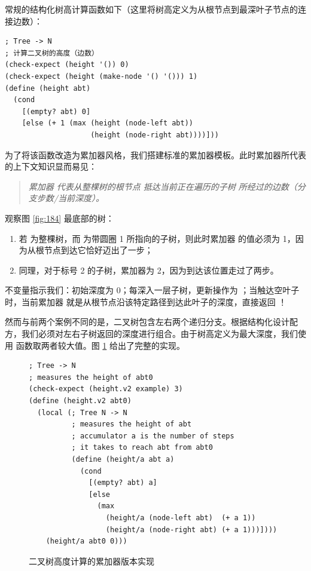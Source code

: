 常规的结构化树高计算函数如下（这里将树高定义为从根节点到最深叶子节点的连接边数）：

\begin{lstlisting}[language=BSL]
; Tree -> N
; 计算二叉树的高度（边数）
(check-expect (height '()) 0)
(check-expect (height (make-node '() '())) 1)
(define (height abt)
  (cond
    [(empty? abt) 0]
    [else (+ 1 (max (height (node-left abt))
                    (height (node-right abt))))]))
\end{lstlisting}

为了将该函数改造为累加器风格，我们搭建标准的累加器模板。此时累加器所代表的上下文知识显而易见：
\begin{quote}
\textit{累加器  代表从整棵树的根节点  抵达当前正在遍历的子树  所经过的边数（分支步数/当前深度）。}
\end{quote}

观察图 \ref{fig:184} 最底部的树：
\begin{enumerate}
  \item 若  为整棵树，而  为带圆圈 1 所指向的子树，则此时累加器  的值必须为 1，因为从根节点到达它恰好迈出了一步；
  \item 同理，对于标号 2 的子树，累加器为 2，因为到达该位置走过了两步。
\end{enumerate}

不变量指示我们：初始深度为 0；每深入一层子树，更新操作为 ；当触达空叶子 \code{\textquotesingle()} 时，当前累加器  就是从根节点沿该特定路径到达此叶子的深度，直接返回 ！

然而与前两个案例不同的是，二叉树包含左右两个递归分支。根据结构化设计配方，我们必须对左右子树返回的深度进行组合。由于树高定义为最大深度，我们使用  函数取两者较大值。图 \ref{fig:185} 给出了完整的实现。

\begin{figure}[htbp]
  \centering
\begin{lstlisting}[language=BSL, basicstyle=\scriptsize\ttfamily]
; Tree -> N
; measures the height of abt0
(check-expect (height.v2 example) 3)
(define (height.v2 abt0)
  (local (; Tree N -> N
          ; measures the height of abt
          ; accumulator a is the number of steps
          ; it takes to reach abt from abt0
          (define (height/a abt a)
            (cond
              [(empty? abt) a]
              [else
                (max
                  (height/a (node-left abt)  (+ a 1))
                  (height/a (node-right abt) (+ a 1)))])))
    (height/a abt0 0)))
\end{lstlisting}
  \caption{二叉树高度计算的累加器版本实现}
  \label{fig:185}
\end{figure}

